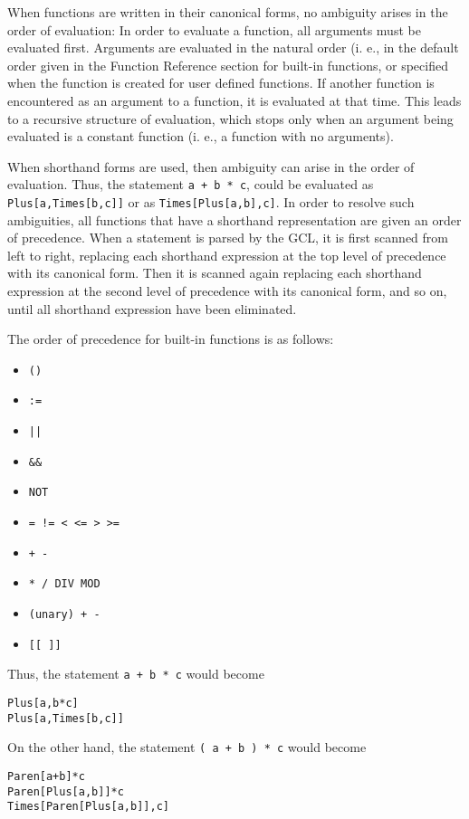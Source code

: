 When functions are written in their canonical forms, no ambiguity
arises in the order of evaluation:  In order to evaluate a function,
all arguments must be evaluated first.  Arguments are evaluated in the
natural order (i. e., in the default order given in the Function
Reference section for built-in functions, or specified when the function is
created for user defined functions.  If another function is
encountered as an argument to a function, it is evaluated at that
time.  This leads to a recursive structure of evaluation, which stops
only when an argument being evaluated is a constant function (i. e., a
function with no arguments).  

When shorthand forms are used, then ambiguity can arise in the order
of evaluation.  Thus, the statement \verb&a + b * c&, could be
evaluated as \verb+Plus[a,Times[b,c]]+ or as
\verb+Times[Plus[a,b],c]+.  In order to resolve such ambiguities, all
functions that have a shorthand representation are given an order of
precedence.  When a statement is parsed by the GCL, it is first
scanned from left to right, replacing each shorthand expression at the
top level of precedence with its canonical form.  Then it is scanned
again replacing each shorthand expression at the second level of
precedence with its canonical form, and so on, until all shorthand
expression have been eliminated.  

The order of precedence for built-in functions is as follows:
\begin{itemize}
\item
\verb+()+
\item
\verb+:=+
\item
\verb+||+
\item
\verb+&&+
\item
\verb+NOT+
\item
\verb+= != < <= > >=+
\item
\verb&+ -&
\item
\verb+* / DIV MOD+
\item
\verb&(unary) + -&
\item
\verb+[[ ]]+
\end{itemize}

Thus, the statement \verb&a + b * c& would become 
\begin{verbatim}
Plus[a,b*c]
Plus[a,Times[b,c]]
\end{verbatim}

On the other hand, the statement \verb&( a + b ) * c& would become 
\begin{verbatim}
Paren[a+b]*c
Paren[Plus[a,b]]*c
Times[Paren[Plus[a,b]],c]
\end{verbatim}

